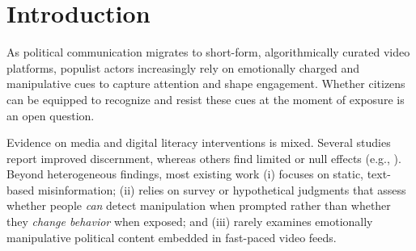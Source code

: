 \documentclass[12pt]{article}
\begin{document}



\section*{Introduction}

As political communication migrates to short-form, algorithmically curated video platforms, populist actors increasingly rely on emotionally charged and manipulative cues to capture attention and shape engagement. Whether citizens can be equipped to recognize and resist these cues at the moment of exposure is an open question.

Evidence on media and digital literacy interventions is mixed. Several studies report improved discernment, whereas others find limited or null effects (e.g., ). Beyond heterogeneous findings, most existing work (i) focuses on static, text-based misinformation; (ii) relies on survey or hypothetical judgments that assess whether people \textit{can} detect manipulation when prompted rather than whether they \textit{change behavior} when exposed; and (iii) rarely examines emotionally manipulative political content embedded in fast-paced video feeds. 
\end{document}
